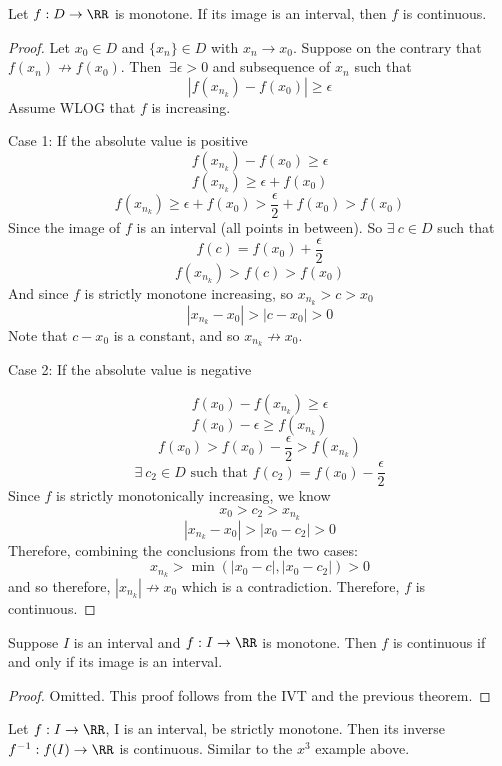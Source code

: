 \documentclass[12pt]{scrartcl}
\begin{document}
\begin{theorem}
  Let $f: D \to \RR$ is monotone. If its image is an interval, then $f$ is continuous.
  \begin{proof}
    Let $x_0 \in D$ and $\{x_n\} \in D$ with $x_n \to x_0$. Suppose on the contrary that 
    $f(x_n) \not\to f(x_0)$. Then $\ \exists \epsilon > 0$ and subsequence of $x_n$ such that 
    \[|f(x_{n_k}) - f(x_0)| \geq \epsilon\]
    Assume WLOG that $f$ is increasing. 

    Case 1: If the absolute value is positive
    \[f(x_{n_k}) - f(x_0) \geq \epsilon\]
    \[f(x_{n_k}) \geq \epsilon + f(x_0)\]
    \[f(x_{n_k}) \geq \epsilon + f(x_0) > \frac{\epsilon}{2} + f(x_0) > f(x_0)\]
    Since the image of $f$ is an interval (all points in between). So $\exists \ c \in D$ such that 
    \[f(c) = f(x_0) + \frac{\epsilon}{2}\]
    \[f(x_{n_k}) > f(c) > f(x_0)\]
    And since $f$ is strictly monotone increasing, so $x_{n_k} > c > x_0$
    \[|x_{n_k} - x_0| > |c - x_0| > 0\]
    Note that $c - x_0$ is a constant, and so $x_{n_k} \not\to x_0$.

    Case 2: If the absolute value is negative

    \[f(x_0) - f(x_{n_k}) \geq \epsilon\]
    \[f(x_0) - \epsilon \geq f(x_{n_k})\]
    \[f(x_0) > f(x_0) - \frac{\epsilon}{2} > f(x_{n_k})\]
    \[\exists \ c_2 \in D \text{ such that } f(c_2) = f(x_0) - \frac{\epsilon}{2}\]
    Since $f$ is strictly monotonically increasing, we know 
    \[x_0 > c_2 > x_{n_k}\]
    \[|x_{n_k} - x_0| > |x_0 - c_2| > 0\]
    Therefore, combining the conclusions from the two cases:
    \[x_{n_k} > \min(|x_0 - c|, |x_0 - c_2|) > 0\]
    and so therefore, $|x_{n_k}| \not\to x_0$
    which is a contradiction. Therefore, $f$ is continuous.
  \end{proof}
\end{theorem}

\begin{theorem}
  Suppose $I$ is an interval and $f: I \to \RR$ is monotone. Then $f$ is continuous
  if and only if its image is an interval.

  \begin{proof}
    Omitted. This proof follows from the IVT and the previous theorem.
  \end{proof}
\end{theorem}

\begin{theorem}
  Let $f: I \to \RR$, I is an interval, be strictly monotone. Then its inverse 
  $f^{-1}: f(I) \to \RR$ is continuous. Similar to the $x^3$ example above.
\end{theorem}
\end{document}
